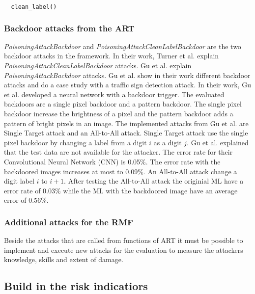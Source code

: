 \begin{lstlisting}
  clean_label()
\end{lstlisting}

\subsubsection*{Backdoor attacks from the ART}
\label{sec:backdoors_art}

\textit{PoisoningAttackBackdoor} and \textit{PoisoningAttackCleanLabelBackdoor} are the two backdoor attacks in the framework. In their work, Turner et al. \cite{turner2018clean} explain
\textit{PoisoningAttackCleanLabelBackdoor} attacks. Gu et al. \cite{DBLP:journals/corr/abs-1708-06733} explain \textit{PoisoningAttackBackdoor} attacks. Gu et al. \cite{DBLP:journals/corr/abs-1708-06733} show in their work different backdoor attacks and do a case study with a traffic sign detection attack. In their work, Gu et al. developed a neural network with a backdoor trigger. The evaluated backdoors are a single pixel backdoor and a pattern backdoor. The single pixel backdoor increase the brightness of a pixel and the pattern backdoor adds a pattern of bright pixels in an image. The implemented attacks from Gu et al. are Single Target attack and an All-to-All attack. Single Target attack use the single pixel backdoor by changing a label from a digit $i$ as a digit $j$. Gu et al. explained that the test data are not available for the attacker. The error rate for their Convolutional Neural Network (CNN) is 0.05\%. The error rate with the backdoored images increases at most to 0.09\%. An All-to-All attack change a digit label $i$ to $i + 1$. After testing the All-to-All attack the originial ML have a error rate of 0.03\% while the ML with the backdoored image have an average error of 0.56\%.

\subsubsection*{Additional attacks for the RMF}

Beside the attacks that are called from functions of ART it must be possible to implement and execute new attacks for the evaluation to measure the attackers knowledge, skills and extent
of damage.

\subsection{Build in the risk indicatiors}

